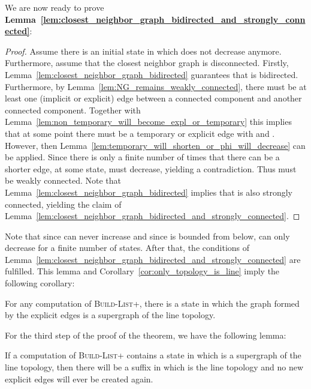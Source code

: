 \documentclass[a4paper,USenglish]{lipics}
\newcommand{\blp}{\textsc{Build-List+}\xspace}
\begin{document}
We are now ready to prove \textbf{Lemma~\ref{lem:closest_neighbor_graph_bidirected_and_strongly_connected}}:
\begin{proof}
  Assume there is an initial state in which  does not decrease anymore.
  Furthermore, assume that the closest neighbor graph  is disconnected.
  Firstly, Lemma~\ref{lem:closest_neighbor_graph_bidirected} guarantees that  is bidirected.
  Furthermore, by Lemma~\ref{lem:NG_remains_weakly_connected}, there must be at least one (implicit or explicit) edge  between a connected component  and another connected component.
  Together with Lemma~\ref{lem:non_temporary_will_become_expl_or_temporary} this implies that at some point there must be a temporary or explicit edge  with  and .
  However, then Lemma~\ref{lem:temporary_will_shorten_or_phi_will_decrease} can be applied.
  Since there is only a finite number of times that there can be a shorter edge, at some state,  must decrease, yielding a contradiction.
  Thus  must be weakly connected.
  Note that Lemma~\ref{lem:closest_neighbor_graph_bidirected} implies that  is also strongly connected, yielding the claim of Lemma~\ref{lem:closest_neighbor_graph_bidirected_and_strongly_connected}.
\end{proof}
Note that since  can never increase and since  is bounded from below,  can only decrease for a finite number of states.
After that, the conditions of Lemma~\ref{lem:closest_neighbor_graph_bidirected_and_strongly_connected} are fulfilled.
This lemma and Corollary~\ref{cor:only_topology_is_line} imply the following corollary:
\begin{corollary}\label{cor:explicit_edge_graph_will_become_supergraph}
 For any computation of \blp, there is a state in which the graph formed by the explicit edges is a supergraph of the line topology.
\end{corollary}
For the third step of the proof of the theorem, we have the following lemma:
\begin{lemma}\label{lem:superfluous_edges_will_vanish}         
 If a computation of \blp contains a state in which  is a supergraph of the line topology, then there will be a suffix in which  is the line topology and no new explicit edges will ever be created again.
\end{lemma}
\end{document}
